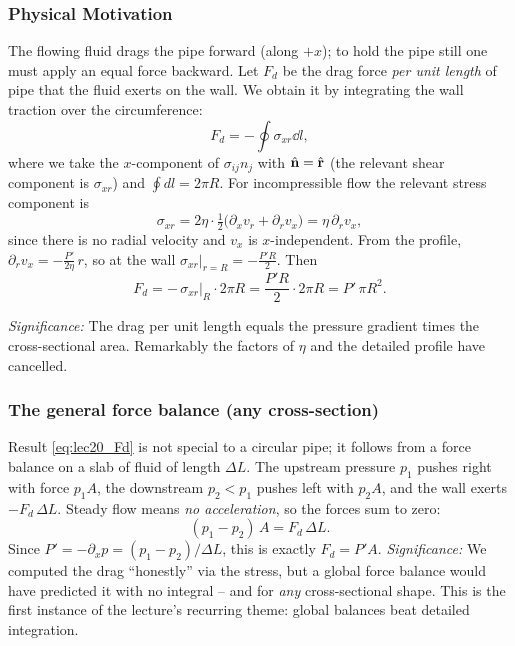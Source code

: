 \documentclass[../main.tex]{subfiles}
\begin{document}
\subsubsection*{Physical Motivation}
The flowing fluid drags the pipe forward (along $+x$); to hold the pipe still one must apply an equal force backward. Let $F_d$ be the drag force \emph{per unit length} of pipe that the fluid exerts on the wall. We obtain it by integrating the wall traction over the circumference:
\begin{equation}
  F_d=-\oint \sigma_{xr}\dd{l} ,
  \label{eq:lec20_Fd_def}
\end{equation}
where we take the $x$-component of $\sigma_{ij}n_j$ with $\hat{\mathbf{n}}=\hat{\mathbf{r}}$ (the relevant shear component is $\sigma_{xr}$) and $\oint dl=2\pi R$. For incompressible flow the relevant stress component is
\begin{equation}
  \sigma_{xr}=2\eta\cdot\tfrac12\big(\partial_x v_r+\partial_r v_x\big)=\eta\,\partial_r v_x ,
  \label{eq:lec20_sigma_xr}
\end{equation}
since there is no radial velocity and $v_x$ is $x$-independent. From the profile, $\partial_r v_x=-\tfrac{P'}{2\eta}\,r$, so at the wall $\sigma_{xr}|_{r=R}=-\tfrac{P'R}{2}$. Then
\begin{equation}
  F_d=-\,\sigma_{xr}\big|_{R}\cdot 2\pi R
     =\frac{P'R}{2}\cdot 2\pi R
     =P'\,\pi R^2 .
  \label{eq:lec20_Fd_calc}
\end{equation}

\textit{Significance:} The drag per unit length equals the pressure gradient times the cross-sectional area. Remarkably the factors of $\eta$ and the detailed profile have cancelled.

\subsubsection*{The general force balance (any cross-section)}
Result \eqref{eq:lec20_Fd} is not special to a circular pipe; it follows from a force balance on a slab of fluid of length $\Delta L$. The upstream pressure $p_1$ pushes right with force $p_1 A$, the downstream $p_2<p_1$ pushes left with $p_2 A$, and the wall exerts $-F_d\,\Delta L$. Steady flow means \emph{no acceleration}, so the forces sum to zero:
\begin{equation}
  (p_1-p_2)\,A=F_d\,\Delta L .
  \label{eq:lec20_balance}
\end{equation}
Since $P'=-\partial_x p=(p_1-p_2)/\Delta L$, this is exactly $F_d=P'A$.
\textit{Significance:} We computed the drag ``honestly'' via the stress, but a global force balance would have predicted it with no integral -- and for \emph{any} cross-sectional shape. This is the first instance of the lecture's recurring theme: global balances beat detailed integration.
\end{document}
